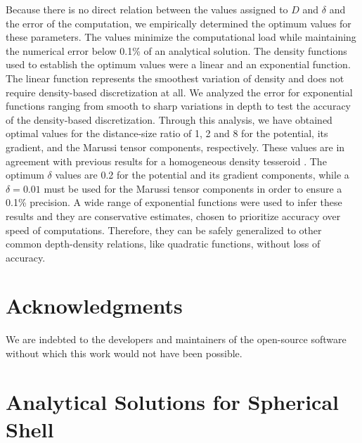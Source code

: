 \documentclass[extra]{gji}
\begin{document}
Because there is no direct relation between the values assigned to $D$ and $\delta$ and
the error of the computation, we empirically determined the optimum values for these
parameters.
The values minimize the computational load while maintaining the numerical error below
0.1\% of an analytical solution.
The density functions used to establish the optimum values were a linear and an
exponential function.
The linear function represents the smoothest variation of density and does not require
density-based discretization at all.
We analyzed the error for exponential functions ranging from smooth to sharp variations
in depth to test the accuracy of the density-based discretization.
Through this analysis, we have obtained optimal values for the distance-size ratio of
1, 2 and 8 for the potential, its gradient, and the Marussi tensor components,
respectively.
These values are in agreement with previous results for a homogeneous density tesseroid
\citep{Uieda2016}.
The optimum $\delta$ values are 0.2 for the potential and its gradient components, while
a $\delta = 0.01$ must be used for the Marussi tensor components in order to ensure a
0.1\% precision.
A wide range of exponential functions were used to infer these results and they are
conservative estimates, chosen to prioritize accuracy over speed of computations.
Therefore, they can be safely generalized to other common depth-density relations, like
quadratic functions, without loss of accuracy.




\section{Acknowledgments}

We are indebted to the developers and maintainers of the open-source software without
which this work would not have been possible.





\appendix

\section{Analytical Solutions for Spherical Shell}
\label{sec:shell}
\end{document}

